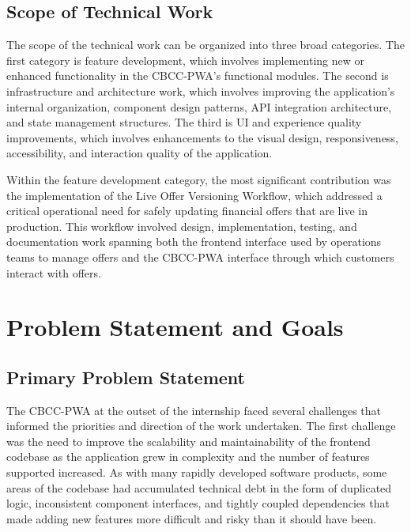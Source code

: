 \subsection{Scope of Technical Work}

The scope of the technical work can be organized into three broad categories. The first category is feature development, which involves implementing new or enhanced functionality in the CBCC-PWA's functional modules. The second is infrastructure and architecture work, which involves improving the application's internal organization, component design patterns, API integration architecture, and state management structures. The third is UI and experience quality improvements, which involves enhancements to the visual design, responsiveness, accessibility, and interaction quality of the application.

Within the feature development category, the most significant contribution was the implementation of the Live Offer Versioning Workflow, which addressed a critical operational need for safely updating financial offers that are live in production. This workflow involved design, implementation, testing, and documentation work spanning both the frontend interface used by operations teams to manage offers and the CBCC-PWA interface through which customers interact with offers.

\section{Problem Statement and Goals}

\subsection{Primary Problem Statement}

The CBCC-PWA at the outset of the internship faced several challenges that informed the priorities and direction of the work undertaken. The first challenge was the need to improve the scalability and maintainability of the frontend codebase as the application grew in complexity and the number of features supported increased. As with many rapidly developed software products, some areas of the codebase had accumulated technical debt in the form of duplicated logic, inconsistent component interfaces, and tightly coupled dependencies that made adding new features more difficult and risky than it should have been.

